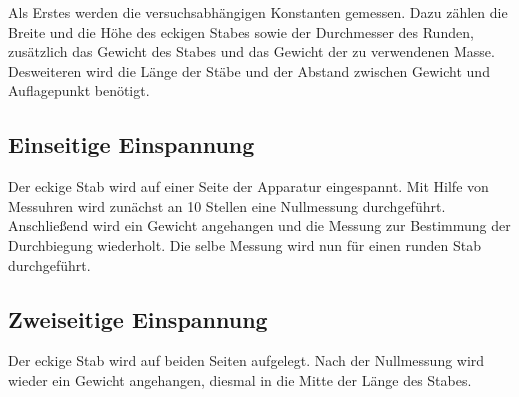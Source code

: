 Als Erstes werden die versuchsabhängigen Konstanten gemessen.
Dazu zählen die Breite und die Höhe des eckigen Stabes sowie der Durchmesser des Runden, zusätzlich das Gewicht des Stabes und das Gewicht der zu verwendenen Masse.
Desweiteren wird die Länge der Stäbe und der Abstand zwischen Gewicht und Auflagepunkt benötigt.
\subsection{Einseitige Einspannung}
Der eckige Stab wird auf einer Seite der Apparatur eingespannt.
Mit Hilfe von Messuhren wird zunächst an 10 Stellen eine Nullmessung durchgeführt.
Anschließend wird ein Gewicht angehangen und die Messung zur Bestimmung der Durchbiegung wiederholt.
Die selbe Messung wird nun für einen runden Stab durchgeführt.

\subsection{Zweiseitige Einspannung}
Der eckige Stab wird auf beiden Seiten aufgelegt.
Nach der Nullmessung wird wieder ein Gewicht angehangen, diesmal in die Mitte der Länge des Stabes.
